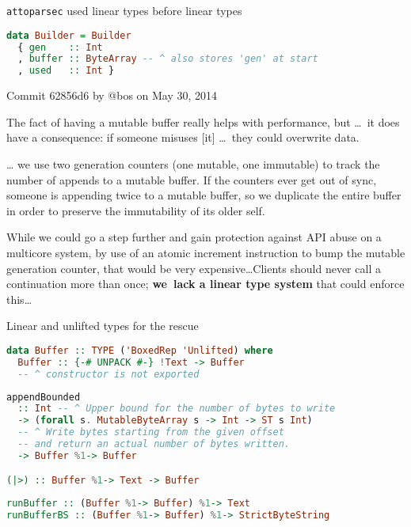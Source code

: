 \documentclass[handout]{beamer}
\begin{document}
\begin{frame}[fragile]{{\tt attoparsec} used linear types before linear types}

\vspace{-1.7ex}

\begin{lstlisting}[language=Haskell]
data Builder = Builder
  { gen    :: Int
  , buffer :: ByteArray -- ^ also stores 'gen' at start
  , used   :: Int }
\end{lstlisting}

\vspace{-1.7ex}

\pause

\begin{block}{Commit 62856d6 by @bos on May 30, 2014}
\small

The fact of having a mutable buffer really helps with performance,
but \dots\ {it does have a consequence: }if someone misuses [it] \dots\ they could overwrite data.


\dots
we use
two generation counters (one mutable, one immutable) to track the
number of appends to a mutable buffer. If the counters ever get out
of sync, someone is appending twice to a mutable buffer, so we
duplicate the entire buffer in order to preserve the immutability
of its older self.

While we could go a step further and gain protection against API
abuse on a multicore system, by use of an atomic increment
instruction to bump the mutable generation counter, that would be
very expensive\dots Clients should never call a continuation more than
once; {\bf we~lack a linear type system} that could enforce this\dots
\end{block}

\end{frame}

\begin{frame}[fragile]{Linear and unlifted types for the rescue}

\begin{lstlisting}[language=Haskell]
data Buffer :: TYPE ('BoxedRep 'Unlifted) where
  Buffer :: {-# UNPACK #-} !Text -> Buffer
  -- ^ constructor is not exported
\end{lstlisting}
\pause
\begin{lstlisting}[language=Haskell]
appendBounded
  :: Int -- ^ Upper bound for the number of bytes to write
  -> (forall s. MutableByteArray s -> Int -> ST s Int)
  -- ^ Write bytes starting from the given offset
  -- and return an actual number of bytes written.
  -> Buffer %1-> Buffer

(|>) :: Buffer %1-> Text -> Buffer
\end{lstlisting}
\pause
\begin{lstlisting}[language=Haskell]
runBuffer :: (Buffer %1-> Buffer) %1-> Text
runBufferBS :: (Buffer %1-> Buffer) %1-> StrictByteString
\end{lstlisting}

\end{frame}
\end{document}
